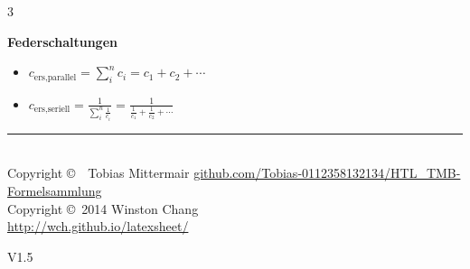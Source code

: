 \documentclass[10pt,a4paper,landscape, hidelinks]{article}
\begin{document}
\begin{multicols*}{3}
\vspace{20pt}

\textbf{Federschaltungen}
\begin{itemize}[leftmargin=*]
        \item [] $c_\text{ers,parallel}=\sum_{i}^{n}c_i=c_1+c_2+\cdots$
        \item [] $c_\text{ers,seriell}=\frac{1}{\sum_{i}^{n}\frac{1}{c_i}}=\frac{1}{\frac{1}{c_1}+\frac{1}{c_2}+\cdots}$
\end{itemize}

\vfill

\setcounter{tocdepth}{2}
\makeatletter
\renewcommand*\l@section{\@dottedtocline{1}{0em}{1.5em}}
\makeatother
\tableofcontents

\vfill

\rule{1\linewidth}{0.25pt}\\
\tiny
Copyright \copyright\ \the\year\ Tobias Mittermair
\href{https://github.com/Tobias-0112358132134/HTL_TMB-Formelsammlung}{github.com/Tobias-0112358132134/HTL\_TMB-Formelsammlung}\\
Copyright \copyright\ 2014 Winston Chang\\
\href{https://wch.github.io/latexsheet/}{http://wch.github.io/latexsheet/}\\
\begin{flushright}
        {\normalsize V1.5}\\
\end{flushright}


\end{multicols*}
\end{document}
